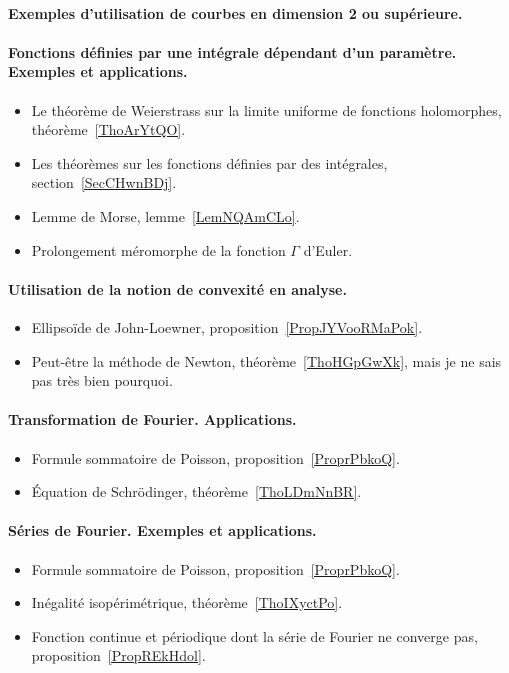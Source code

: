 \paragraph{Exemples d'utilisation de courbes en dimension 2 ou supérieure.}


\paragraph{Fonctions définies par une intégrale dépendant d’un paramètre. Exemples et applications.}
\begin{itemize}
    \item Le théorème de Weierstrass sur la limite uniforme de fonctions holomorphes, théorème~\ref{ThoArYtQO}.
    \item Les théorèmes sur les fonctions définies par des intégrales, section~\ref{SecCHwnBDj}.
    \item Lemme de Morse, lemme~\ref{LemNQAmCLo}.
    \item Prolongement méromorphe de la fonction \( \Gamma\) d'Euler.
\end{itemize}
\paragraph{Utilisation de la notion de convexité en analyse.}
\begin{itemize}
    \item Ellipsoïde de John-Loewner, proposition~\ref{PropJYVooRMaPok}.
    \item Peut-être la méthode de Newton, théorème~\ref{ThoHGpGwXk}, mais je ne sais pas très bien pourquoi.
\end{itemize}

\paragraph{Transformation de Fourier. Applications.}
\begin{itemize}
    \item Formule sommatoire de Poisson, proposition~\ref{ProprPbkoQ}.
    \item Équation de Schrödinger, théorème~\ref{ThoLDmNnBR}.
\end{itemize}

\paragraph{Séries de Fourier. Exemples et applications.}
\begin{itemize}
    \item Formule sommatoire de Poisson, proposition~\ref{ProprPbkoQ}.
    \item Inégalité isopérimétrique, théorème~\ref{ThoIXyctPo}.
    \item Fonction continue et périodique dont la série de Fourier ne converge pas, proposition~\ref{PropREkHdol}.
\end{itemize}

